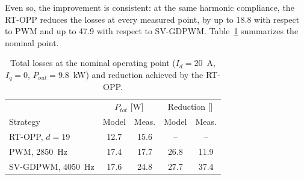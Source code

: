 \documentclass[conference]{IEEEtran}
\newcommand{\pct}{\text{\char`\%}}
\newcommand{\old}[1]{\par\smallskip\noindent{\color{gray}\footnotesize
    \textbf{[ANTES]} #1}\par\smallskip}
\renewcommand{\old}[1]{}       %
\begin{document}
\old{\dots\ where the datasheet switching energies are least
representative; since this offset exceeds that of the OPP, the measured
reduction with respect to SV-GDPWM remains close to the model. Including
the current ripple in the loss model and characterizing the switching
energies of the module with DPT are left for future work.}
\old{First, the measured losses exceed the model by an offset due to effects
that the model does not include \textbf{[XX]}, which for PD-PWM is nearly
constant, between 4.3 and 6.5~W. [\dots] Accordingly, the offset of the OPP
exceeds that of PD-PWM by 1.9~W on average, which reduces the mean measured
difference from 3.3 to 1.4~W. Including the current ripple in the loss model
is left for future work.}

Even so, the improvement is consistent: at the same harmonic compliance,
the RT-OPP reduces the losses at every measured point, by
up to 18.8\pct{} with respect to PWM and up to 47.9\pct{} with respect to
SV-GDPWM. Table~\ref{tab:comparacion} summarizes the nominal point.

\begin{table}[!t]
    \centering
    \caption{Total losses at the nominal operating point ($I_d = 20$~A,
    $I_q = 0$, $P_{out} = 9.8$~kW) and reduction achieved by the RT-OPP.}
    \bgroup
    \def\arraystretch{1.0}
    \setlength{\tabcolsep}{4pt}
    \begin{tabular*}{\columnwidth}{@{\extracolsep{\fill}}lcccc@{}}
        \toprule
        \rowcolor{Gray}
        & \multicolumn{2}{c}{$P_{tot}$ [W]} & \multicolumn{2}{c}{Reduction [\pct{}]} \\
        \rowcolor{Gray}
        Strategy & Model & Meas. & Model & Meas. \\
        \midrule
        RT-OPP, $d=19$     & 12.7 & 15.6 & --   & --   \\
        PWM, 2850~Hz    & 17.4 & 17.7 & 26.8 & 11.9 \\
        SV-GDPWM, 4050~Hz  & 17.6 & 24.8 & 27.7 & 37.4 \\
        \bottomrule
    \end{tabular*}
    \egroup
    \label{tab:comparacion}
\end{table}
\old{Tabla, columna Meas.: RT-OPP 19.6~W; PWM 21.7~W y 9.7\pct{};
SV-GDPWM 28.8~W y 32.2\pct{}.}
\end{document}
